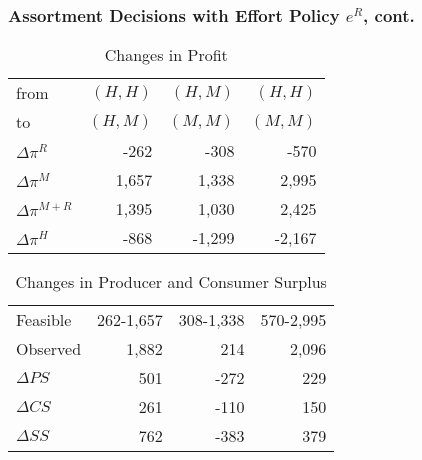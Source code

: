 \documentclass[aspectratio=169]{beamer}
\begin{document}
\begin{frame}
\frametitle{Assortment Decisions with Effort Policy $e^R$, cont.}
\vspace{-0.4in}
\begin{table}[htp]
\caption{Changes in Profit}
\begin{center}
\begin{tabular}{|l| rrr|}
\hline
from &\hspace{0.15in} $(H,H)$ &\hspace{0.15in} $(H,M)$ & \hspace{0.15in}$(H,H)$ \\
to &\hspace{0.15in} $(H,M)$ & \hspace{0.15in}$(M,M)$ & \hspace{0.15in}$(M,M)$\\
 \hline
$\Delta \pi^R$&   -262 & -308& -570 \\
$\Delta \pi^M$ &  1,657 & 1,338 & 2,995 \\
$\Delta \pi^{M+R}$&   1,395 & 1,030& 2,425 \\
$\Delta \pi^H$  &-868 & -1,299 & -2,167 \\
 \hline
 \end{tabular}
\end{center}
\label{tab:assortmentonly2}
\end{table}
\vspace{-0.3in}
\begin{table}[htp]
\begin{center}
\caption{Changes in Producer and Consumer Surplus}
\begin{tabular}{|l| rrr|}
\hline
Feasible & 262-1,657 & 308-1,338&570-2,995 \\
Observed & 1,882 & 214& 2,096 \\
\hline
$\Delta PS$ & 501 & -272 & 229 \\
$\Delta CS$ &261 & -110 & 150 \\
$\Delta SS$ &762 & -383 & 379 \\ \hline
\end{tabular}
\end{center}
\label{tab:assortmentonly3}
\end{table}

\end{frame}
\end{document}
